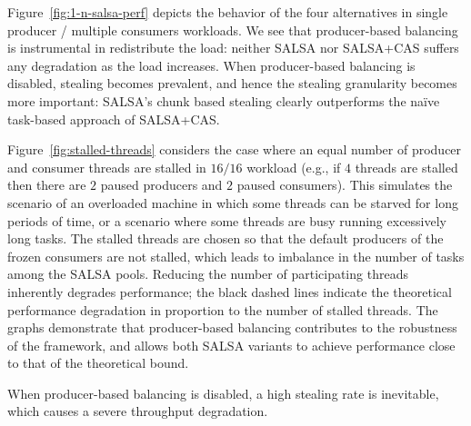 Figure~\ref{fig:1-n-salsa-perf} depicts the behavior of the four alternatives in single producer / multiple consumers workloads. 
We see that producer-based balancing is instrumental in redistribute the load: neither SALSA nor SALSA+CAS suffers any degradation as the load increases. 
When producer-based balancing is disabled, stealing becomes prevalent, and hence the stealing granularity becomes more important: 
SALSA's chunk based stealing clearly outperforms the na\"{i}ve task-based approach of SALSA+CAS. 

Figure~\ref{fig:stalled-threads} considers the case where an equal number of producer and consumer threads are stalled in $16/16$ workload (e.g., if $4$ threads are stalled then there are $2$ paused producers and $2$ paused consumers). This simulates the scenario of an overloaded machine in which some threads can be starved for long periods of time, or a scenario where some threads are busy running excessively long tasks. 
The stalled threads are chosen so that the default producers of the frozen consumers are not stalled, which leads to imbalance in the number of tasks among the SALSA pools. 
Reducing the number of participating threads inherently degrades performance; the black dashed lines indicate the theoretical performance degradation in proportion to the number of stalled threads.
The graphs demonstrate that producer-based balancing contributes to the robustness of the framework, and allows both SALSA variants to achieve performance close to that of the theoretical bound.

When producer-based balancing is disabled, a high stealing rate is inevitable, which causes a severe throughput degradation.

%
%
%
%
